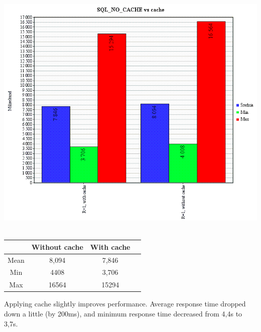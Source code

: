 \documentclass[10pt,a4paper]{article}
\begin{document}
\includegraphics[width=1.15\textwidth]{./cache_vs_nocache}~\\[1cm]

\begin{tabular}{|c|c|c|c|}
\hline
& 
Without cache &
With cache \\
\hline
Mean &
8,094 &
7,846 \\
\hline

Min &
4408 & 
3,706 \\
\hline
Max &
16564 &
15294 \\
\end{tabular}

Applying cache slightly improves performance. Average response time dropped down a little (by 200ms), and minimum response time decreased from 4,4s to 3,7s. 
\end{document}
